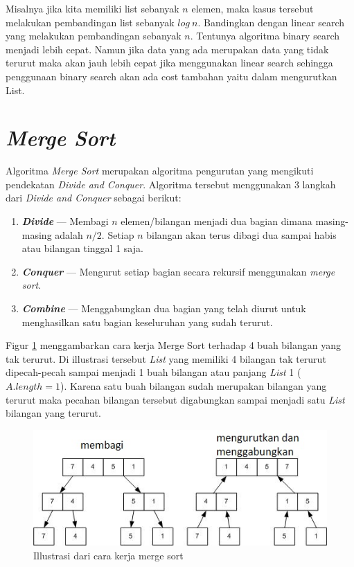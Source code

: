 Misalnya jika kita memiliki list sebanyak $n$ elemen, maka kasus tersebut melakukan pembandingan list sebanyak $log\ n$. Bandingkan dengan linear search yang  melakukan pembandingan sebanyak $n$. Tentunya algoritma binary search menjadi lebih cepat. Namun jika data yang ada merupakan data yang tidak terurut maka akan jauh lebih cepat jika menggunakan linear search sehingga penggunaan binary search akan ada cost tambahan yaitu dalam mengurutkan List.

\section{\textit{Merge Sort}}
Algoritma \textit{Merge Sort} merupakan algoritma pengurutan yang mengikuti pendekatan \textit{Divide and Conquer}. Algoritma tersebut menggunakan 3 langkah dari \textit{Divide and Conquer} sebagai berikut:
\begin{enumerate}
\item \textbf{\textit{Divide}} --- Membagi $n$ elemen/bilangan menjadi dua bagian dimana masing-masing adalah $n/2$. Setiap $n$ bilangan akan terus dibagi dua sampai habis atau bilangan tinggal 1 saja.
\item \textbf{\textit{Conquer}} --- Mengurut setiap bagian secara rekursif menggunakan \textit{merge sort}. 
\item \textbf{\textit{Combine}} --- Menggabungkan dua bagian yang telah diurut untuk menghasilkan satu bagian keseluruhan yang sudah terurut.
\end{enumerate}

Figur \ref{fig:mergeSortIllustration} menggambarkan cara kerja Merge Sort terhadap 4 buah bilangan yang tak terurut. Di illustrasi tersebut \textit{List} yang memiliki 4 bilangan tak terurut dipecah-pecah sampai menjadi 1 buah bilangan atau panjang \textit{List} 1 ($A.length = 1$). Karena satu buah bilangan sudah merupakan bilangan yang terurut maka pecahan bilangan tersebut digabungkan sampai menjadi satu \textit{List} bilangan yang terurut. 

\begin{figure}[htbp]
\begin{center}
	\includegraphics[scale=0.8]{fig/sunario-3/mergeSort1.jpg}%
	\caption{Illustrasi dari cara kerja merge sort}%
	\label{fig:mergeSortIllustration}%
\end{center}
\end{figure}


